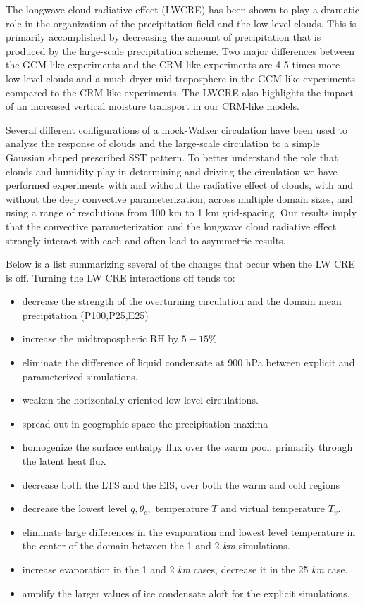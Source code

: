 \documentclass[draft]{agujournal2019}
\begin{document}
The longwave cloud radiative effect (LWCRE) has been shown to play a dramatic role in the organization of the precipitation
field and the low-level clouds.  This is primarily accomplished by decreasing the amount of precipitation that is produced 
by the large-scale precipitation scheme.  Two major differences between the GCM-like experiments and the CRM-like 
experiments are 4-5 times more low-level clouds and a much dryer mid-troposphere in the GCM-like experiments compared 
to the CRM-like experiments.  The LWCRE also highlights the impact of an increased vertical moisture transport 
in our CRM-like models.  

Several different configurations of a mock-Walker circulation have been used to analyze the response of clouds and the 
large-scale circulation to a simple Gaussian shaped prescribed SST pattern.  To better understand the role that clouds
and humidity play in determining and driving the circulation we have performed experiments with and without the radiative
effect of clouds, with and without the deep convective parameterization, across multiple domain sizes,  
and using a range of resolutions from 100 km to 1 km grid-spacing.  Our results imply that the convective 
parameterization and the longwave cloud radiative effect strongly interact with each and often lead to 
asymmetric results.   

Below is a list summarizing several of the changes that occur when the LW CRE is off.  Turning the LW CRE interactions off tends to: 

\begin{itemize}
  \item decrease the strength of the overturning circulation and the domain mean precipitation (P100,P25,E25)
  \item increase the midtropospheric RH by $5-15 \% $
  \item eliminate the difference of liquid condensate at 900 hPa between explicit and parameterized simulations.
  \item weaken the horizontally oriented low-level circulations.   
  \item spread out in geographic space the precipitation maxima
  \item homogenize the surface enthalpy flux over the warm pool, primarily through the latent heat flux
  \item decrease both the LTS and the EIS, over both the warm and cold regions
  \item decrease the lowest level $q, \theta_e,$ temperature $T$ and virtual temperature $T_v$.  
  \item eliminate large differences in the evaporation and lowest level temperature in the center of the domain between 
           the 1 and 2 \textit{km} simulations. 
  \item increase evaporation in the 1 and 2 \textit{km} cases, decrease it in the 25 \textit{km} case.
  \item amplify the larger values of ice condensate aloft for the explicit simulations.  
\end{itemize}
\end{document}
